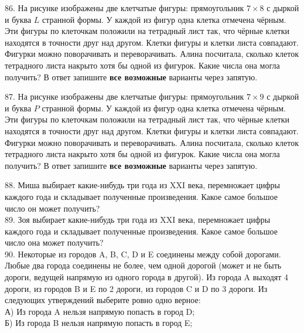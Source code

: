 86. На рисунке изображены две клетчатые фигуры: прямоугольник $7\times8$ с дыркой и буква $L$ странной формы. У каждой из фигур одна клетка отмечена чёрным. Эти фигуры по клеточкам положили на тетрадный лист так, что чёрные клетки находятся в точности друг над другом. Клетки фигуры и клетки листа совпадают. Фигурки можно поворачивать и переворачивать. Алина посчитала, сколько клеток тетрадного листа накрыто хотя бы одной из фигурок. Какие числа она могла получить? В ответ запишите {\bf все возможные} варианты через запятую.
\begin{center}
\begin{figure}[ht!]
\end{figure}
\end{center}
87. На рисунке изображены две клетчатые фигуры: прямоугольник $7\times9$ с дыркой и буква $P$ странной формы. У каждой из фигур одна клетка отмечена чёрным. Эти фигуры по клеточкам положили на тетрадный лист так, что чёрные клетки находятся в точности друг над другом. Клетки фигуры и клетки листа совпадают. Фигурки можно поворачивать и переворачивать. Алина посчитала, сколько клеток тетрадного листа накрыто хотя бы одной из фигурок. Какие числа она могла получить? В ответ запишите {\bf все возможные} варианты через запятую.
\begin{center}
\begin{figure}[ht!]
\end{figure}
\end{center}
88. Миша выбирает какие-нибудь три года из XXI века, перемножает цифры каждого года и складывает полученные произведения. Какое самое большое число он может получить?\\
89. Зоя выбирает какие-нибудь три года из XXI века, перемножает цифры каждого года и складывает полученные произведения. Какое самое большое число она может получить?\\
90. Некоторые из городов A, B, C, D и E соединены между собой дорогами. Любые два города соединены не более, чем одной дорогой (может и не быть дороги, ведущей напрямую из одного города в другой). Из города A выходят 4 дороги, из городов B и E по 2 дороги, из городов C и D по 3 дороги. Из следующих утверждений выберите ровно одно верное:\\
А) Из города A нельзя напрямую попасть в город D;\\
Б) Из города B нельзя напрямую попасть в город E;\\
